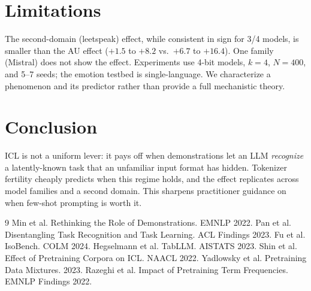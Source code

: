 \documentclass[11pt]{article}
\begin{document}
\section{Limitations}
The second-domain (leetspeak) effect, while consistent in sign for 3/4 models, is smaller
than the AU effect ($+1.5$ to $+8.2$ vs.\ $+6.7$ to $+16.4$). One family (Mistral) does not
show the effect. Experiments use 4-bit models, $k{=}4$, $N{=}400$, and 5--7 seeds; the
emotion testbed is single-language. We characterize a phenomenon and its predictor rather
than provide a full mechanistic theory.

\section{Conclusion}
ICL is not a uniform lever: it pays off when demonstrations let an LLM \emph{recognize} a
latently-known task that an unfamiliar input format has hidden. Tokenizer fertility cheaply
predicts when this regime holds, and the effect replicates across model families and a
second domain. This sharpens practitioner guidance on when few-shot prompting is worth it.

\begin{thebibliography}{9}\small
{} Min et al. Rethinking the Role of Demonstrations. EMNLP 2022.
 Pan et al. Disentangling Task Recognition and Task Learning. ACL Findings 2023.
 Fu et al. IsoBench. COLM 2024.
 Hegselmann et al. TabLLM. AISTATS 2023.
 Shin et al. Effect of Pretraining Corpora on ICL. NAACL 2022.
 Yadlowsky et al. Pretraining Data Mixtures. 2023.
 Razeghi et al. Impact of Pretraining Term Frequencies. EMNLP Findings 2022.
\end{thebibliography}
\end{document}
